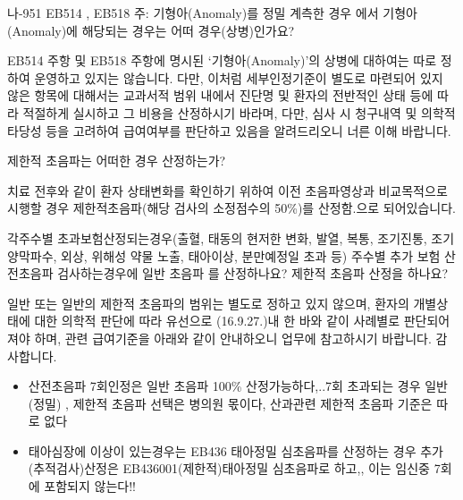 \textsf{나-951 EB514 , EB518 주: 기형아(Anomaly)를 정밀 계측한 경우 에서 기형아(Anomaly)에 해당되는 경우는 어떠 경우(상병)인가요?}
\begin{commentbox}{}
EB514 주항 및 EB518 주항에 명시된 ‘기형아(Anomaly)’의 상병에 대하여는 따로 정하여 운영하고 있지는 않습니다. 다만, 이처럼 세부인정기준이 별도로 마련되어 있지 않은 항목에 대해서는 교과서적 범위 내에서 진단명 및 환자의 전반적인 상태 등에 따라 적절하게 실시하고 그 비용을 산정하시기 바라며, 다만, 심사 시 청구내역 및 의학적 타당성 등을 고려하여 급여여부를 판단하고 있음을 알려드리오니 너른 이해 바랍니다.
\end{commentbox}

\textsf{제한적 초음파는 어떠한 경우 산정하는가?}
\begin{commentbox}{}
치료 전\bullet 후와 같이 환자 상태변화를 확인하기 위하여 이전 초음파영상과 비교목적으로 시행할 경우 제한적초음파(해당 검사의 소정점수의 50\%)를 산정함.으로 되어있습니다.
\end{commentbox}

\textsf{각주수별 초과보험산정되는경우(출혈, 태동의 현저한 변화, 발열, 복통, 조기진통, 조기양막파수, 외상, 위해성 약물 노출, 태아이상, 분만예정일 초과 등) 주수별 추가 보험 산전초음파 검사하는경우에 일반 초음파 를 산정하나요? 제한적 초음파 산정을 하나요?}
\begin{commentbox}{}
일반 또는 일반의 제한적 초음파의 범위는 별도로 정하고 있지 않으며, 환자의 개별상태에 대한 의학적 판단에 따라 유선으로 (16.9.27.)내 한 바와 같이 사례별로 판단되어져야 하며, 관련 급여기준을 아래와 같이 안내하오니 업무에 참고하시기 바랍니다. 감사합니다.
\begin{itemize}\tightlist
\item 산전초음파 7회인정은 일반 초음파 100\% 산정가능하다,..7회 초과되는 경우 일반(정밀) , 제한적 초음파 선택은 병의원 몫이다, 산과관련 제한적 초음파 기준은 따로 없다
\item 태아심장에 이상이 있는경우는 EB436 태아정밀 심초음파를   산정하는 경우 추가 (추적검사)산정은 EB436001(제한적)태아정밀 심초음파로 하고,, 이는 임신중 7회에 포함되지 않는다!!
\end{itemize} 
\end{commentbox}